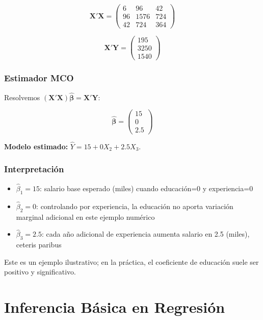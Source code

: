\documentclass[11pt,a4paper]{article}
\begin{document}
\[
\mathbf{X}'\mathbf{X} = \begin{pmatrix}
6 & 96 & 42 \\
96 & 1576 & 724 \\
42 & 724 & 364
\end{pmatrix}
\]
 
\[
\mathbf{X}'\mathbf{Y} = \begin{pmatrix} 195 \\ 3250 \\ 1540 \end{pmatrix}
\]
 
\subsubsection*{Estimador MCO}
 
Resolvemos $(\mathbf{X}'\mathbf{X})\hat{\boldsymbol{\beta}} = \mathbf{X}'\mathbf{Y}$:
 
\[
\hat{\boldsymbol{\beta}} = \begin{pmatrix} 15 \\ 0 \\ 2.5 \end{pmatrix}
\]
 
\textbf{Modelo estimado:} \(\hat{Y} = 15 + 0X_2 + 2.5X_3\).
 
\subsubsection*{Interpretación}
 
\begin{itemize}[noitemsep]
    \item $\hat{\beta}_1 = 15$: salario base esperado (miles) cuando educación=0 y experiencia=0
    \item $\hat{\beta}_2 = 0$: controlando por experiencia, la educación no aporta variación marginal adicional en este ejemplo numérico
    \item $\hat{\beta}_3 = 2.5$: cada año adicional de experiencia aumenta salario en 2.5 (miles), ceteris paribus
\end{itemize}

\begin{observacion}
Este es un ejemplo ilustrativo; en la práctica, el coeficiente de educación suele ser positivo y significativo.
\end{observacion}
 
\section{Inferencia Básica en Regresión}
\end{document}
